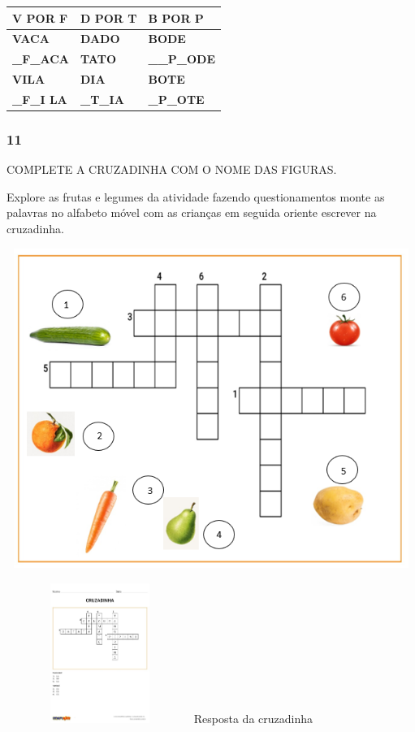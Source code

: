 \begin{longtable}[]{@{}lll@{}}
\toprule
\textbf{V POR F} & \textbf{D POR T} & \textbf{B POR P}\tabularnewline
\midrule
\endhead
\textbf{VACA} & \textbf{DADO} & \textbf{BODE}\tabularnewline
\textbf{\_F\_ACA} & \textbf{TATO} & \textbf{\_\_P\_ODE}\tabularnewline
\textbf{VILA} & \textbf{DIA} & \textbf{BOTE}\tabularnewline
\textbf{\_F\_I LA} & \textbf{\_T\_IA} & \textbf{\_P\_OTE}\tabularnewline
\bottomrule
\end{longtable}

\subsubsection{11 }\label{section-10}

COMPLETE A CRUZADINHA COM O NOME DAS FIGURAS.

Explore as frutas e legumes da atividade fazendo questionamentos monte
as palavras no alfabeto móvel com as crianças em seguida oriente
escrever na cruzadinha.

\includegraphics[width=5.69167in,height=4.10139in]{media/image40.png}

\includegraphics[width=2.40385in,height=1.79075in]{media/image41.jpeg}Resposta
da cruzadinha

